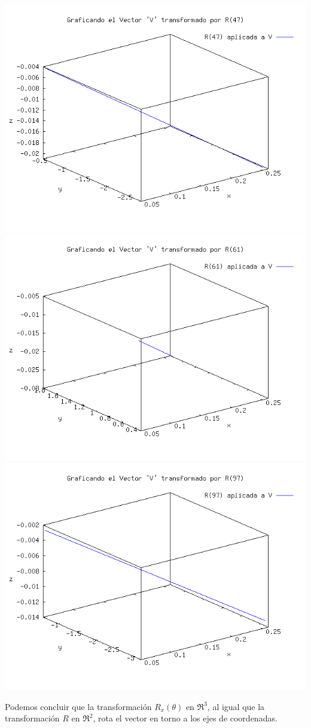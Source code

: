 \begin{enumerate}
		\includegraphics[scale=0.3]{imagenes/3_vc3.png}\\
		\includegraphics[scale=0.3]{imagenes/3_vd3.png}
		\includegraphics[scale=0.3]{imagenes/3_ve3.png}

		Podemos concluir que la transformación $R_x(\theta)$ en $\Re^3$, al igual que la transformación $R$
		en $\Re^2$, rota el vector en torno a los ejes de coordenadas.
\end{enumerate}
